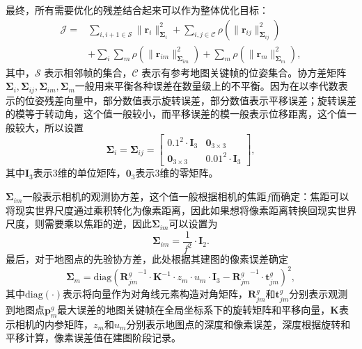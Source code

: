 最终，所有需要优化的残差结合起来可以作为整体优化目标：
\begin{equation}
\begin{aligned}
  \mathcal{J} = & \sum_{i,i+1\in\mathcal{S}}\|\symbf{r}_i\|_{\symbf{\Sigma}_{i}}^2 + \sum_{i,j\in\mathcal{C}}\rho(\|\symbf{r}_{ij}\|_{\symbf{\Sigma}_{ij}}^2) \\ 
  &+ \sum_i \sum_m \rho(\| \symbf{r}_{im} \|_{\symbf{\Sigma}_{im}}^2) + \sum_m \rho(\| \symbf{r}_m \|_{\symbf{\Sigma}_{m}}^2),
\end{aligned}
\end{equation}
其中，$\mathcal{S}$ 表示相邻帧的集合，$\mathcal{C}$ 表示有参考地图关键帧的位姿集合。协方差矩阵$\symbf{\Sigma}_{i},\symbf{\Sigma}_{ij},\symbf{\Sigma}_{im},\symbf{\Sigma}_{m}$一般用来平衡各种误差在数量级上的不平衡。因为在以李代数表示的位姿残差向量中，部分数值表示旋转误差，部分数值表示平移误差；旋转误差的模等于转动角，这个值一般较小，而平移误差的模一般表示位移距离，这个值一般较大，所以设置
\begin{equation}
  \symbf{\Sigma}_{i} = \symbf{\Sigma}_{ij} = 
  \begin{bmatrix}
    0.1^2 \cdot \symbf{I}_3 & \symbf{0}_{3\times 3} \\
    \symbf{0}_{3\times 3} & 0.01^2 \cdot \symbf{I}_3
  \end{bmatrix},
\end{equation}
其中$\symbf{I}_3$表示3维的单位矩阵，$\symbf{0}_3$表示3维的零矩阵。

$\symbf{\Sigma}_{im}$一般表示相机的观测协方差，这个值一般根据相机的焦距$f$而确定：焦距可以将现实世界尺度通过乘积转化为像素距离，因此如果想将像素距离转换回现实世界尺度，则需要乘以焦距的逆，因此$\symbf{\Sigma}_{im}$可以设置为
\begin{equation}
  \symbf{\Sigma}_{im} = \frac{1}{f^2} \cdot \symbf{I}_2.
\end{equation}
最后，对于地图点的先验协方差，此处根据其建图的像素误差确定
\begin{equation}
  \symbf{\Sigma}_{m} = \text{diag}({\symbf{R}_{jm}^g}^{-1}\cdot\symbf{K}^{-1}\cdot z_m \cdot u_m \cdot \symbf{I}_3 - {\symbf{R}_{jm}^g}^{-1}\cdot\symbf{t}_{jm}^g)^2,
\end{equation}
其中$\text{diag}(\cdot)$表示将向量作为对角线元素构造对角矩阵，$\symbf{R}_{jm}^g$和$\symbf{t}_{jm}^g$分别表示观测到地图点$\symbf{p}_m^g$最大误差的地图关键帧在全局坐标系下的旋转矩阵和平移向量，$\symbf{K}$表示相机的内参矩阵，$z_m$和$u_m$分别表示地图点的深度和像素误差，深度根据旋转和平移计算，像素误差值在建图阶段记录。

